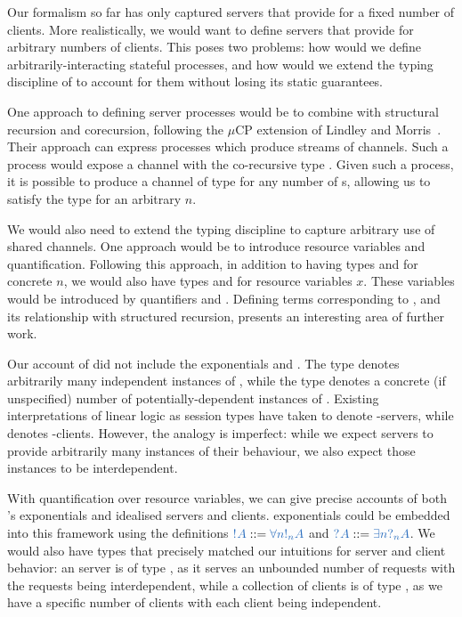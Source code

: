 \documentclass[envcountsame,UKenglish]{llncs}
\begin{document}
Our formalism so far has only captured servers that provide for a fixed number of clients.  More realistically, we would want to define servers that provide for arbitrary numbers of clients.  This poses two problems: how would we define arbitrarily-interacting stateful processes, and how would we extend the typing discipline of \nodcap to account for them without losing its static guarantees.

One approach to defining server processes would be to combine \nodcap with structural recursion and corecursion, following the $\mu\text{CP}$ extension of Lindley and Morris~\cite{lindley2016}.  Their approach can express processes which produce streams of  channels. Such a process would expose a channel with the co-recursive type .  Given such a process, it is possible to produce a channel of type  for any number of s, allowing us to satisfy the type  for an arbitrary $n$.

We would also need to extend the typing discipline to capture arbitrary use of shared channels.  One approach would be to introduce resource variables and quantification.  Following this approach, in addition to having types  and  for concrete $n$, we would also have types  and  for resource variables $x$.  These variables would be introduced by quantifiers  and . Defining terms corresponding to , and its relationship with structured recursion, presents an interesting area of further work.

Our account of \hcp did not include the exponentials  and . The type  denotes arbitrarily many independent instances of , while the type  denotes a concrete (if unspecified) number of potentially-dependent instances of .  Existing interpretations of linear logic as session types have taken  to denote -servers, while  denotes -clients.  However, the analogy is imperfect: while we expect servers to provide arbitrarily many instances of their behaviour, we also expect those instances to be interdependent.

With quantification over resource variables, we can give precise accounts of both \cp's exponentials and idealised servers and clients. \cp exponentials could be embedded into this framework using the definitions $\ty{\take{A}} ::= \ty{\forall{n}\take[n]{A}}$ and $\ty{\give{A}} ::= \ty{\exists{n}{\give[n]{A}}}$. We would also have types that precisely matched our intuitions for server and client behavior: an  server is of type , as it serves an unbounded number of requests with the requests being interdependent, while a collection of  clients is of type , as we have a specific number of clients with each client being independent.



\end{document}
